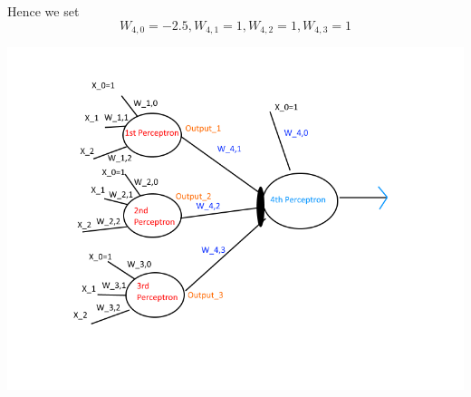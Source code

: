 \documentclass[12pt, letterpaper]{article}
\begin{document}
	Hence we set $$W_{4,0}=-2.5,W_{4,1}=1,W_{4,2}=1,W_{4,3}=1$$\newline
	
	\includegraphics[scale=0.6]{"problem-5b-2"}
	
	
	
	
\end{document}
